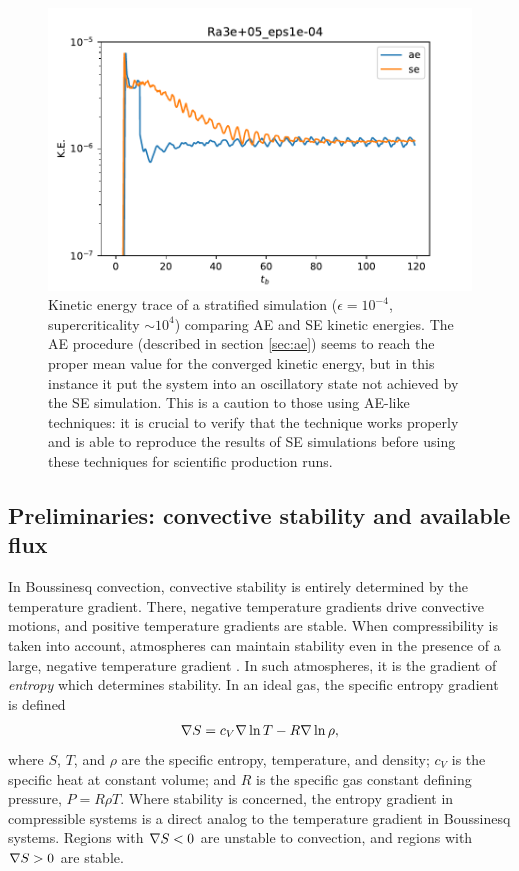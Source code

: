 \begin{figure}[t!]
    \includegraphics[width=\textwidth]{figs/unpublished/gabo_ae.pdf}
    \caption[Timeseries of kinetic energy in stratified AE vs.~SE.]{
	Kinetic energy trace of a stratified simulation ($\epsilon = 10^{-4}$, supercriticality $\sim 10^4$) comparing AE and SE kinetic energies.
	The AE procedure (described in section \ref{sec:ae}) seems to reach the proper mean value for the converged kinetic energy, but in this instance it put the system into an oscillatory state not achieved by the SE simulation.
	This is a caution to those using AE-like techniques: it is crucial to verify that the technique works properly and is able to reproduce the results of SE simulations before using these techniques for scientific production runs.
    \label{fig:gabo_ae} }
\end{figure}

\subsection{Preliminaries: convective stability and available flux}
\label{sec:stability}
In Boussinesq convection, convective stability is entirely determined by the temperature gradient.
There, negative temperature gradients drive convective motions, and positive temperature gradients are stable.
When compressibility is taken into account, atmospheres can maintain stability even in the presence of a large, negative temperature gradient \citep{spiegel&veronis1960}.
In such atmospheres, it is the gradient of \emph{entropy} which determines stability.
In an ideal gas, the specific entropy gradient is defined
\begin{equation}
\nabla S = c_V \nabla\ln T - R \nabla\ln\rho,
\end{equation}
where $S$, $T$, and $\rho$ are the specific entropy, temperature, and density; $c_V$ is the specific heat at constant volume; and $R$ is the specific gas constant defining pressure, $P = R \rho T$.
Where stability is concerned, the entropy gradient in compressible systems is a direct analog to the temperature gradient in Boussinesq systems.
Regions with $\nabla S < 0$ are unstable to convection, and regions with $\nabla S > 0$ are stable.

